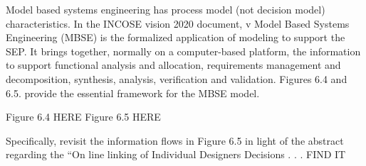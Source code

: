 Model based systems engineering has process model (not decision model) characteristics. In the INCOSE vision 2020 document, v Model Based Systems Engineering (MBSE) is the formalized application of modeling to support the SEP. It brings together, normally on a computer-based platform, the information to support functional analysis and allocation, requirements management and decomposition, synthesis, analysis, verification and validation. Figures 6.4 and 6.5. provide the essential framework for the MBSE model.

Figure 6.4 HERE
Figure 6.5 HERE
	
Specifically, revisit the information flows in Figure 6.5 in light of the abstract regarding the “On line linking of Individual Designers Decisions . . . FIND IT